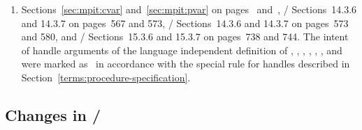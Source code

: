 \begin{enumerate}
\item Sections~\ref{sec:mpit:cvar} and~\ref{sec:mpit:pvar} on pages~\pageref{sec:mpit:cvar} and~\pageref{sec:mpit:pvar}, \MPIIII/ Sections~14.3.6 and 14.3.7 on pages~567 and 573, \MPIIIIDOTI/ Sections~14.3.6 and 14.3.7 on pages~573 and 580, and \MPIIV/ Sections~15.3.6 and 15.3.7 on pages~738 and 744.
\newline
The intent of handle arguments of the language independent definition of
, %
,\flushline %
, %
, %
, %
, and %
%
were marked as \INOUT\ in accordance with the special rule for handles described in Section~\ref{terms:procedure-specification}.

\end{enumerate}

\subsection{Changes in \texorpdfstring{\MPIIVDOTI/}{MPI-4.1}}
\label{subsec:changes-40-41}

